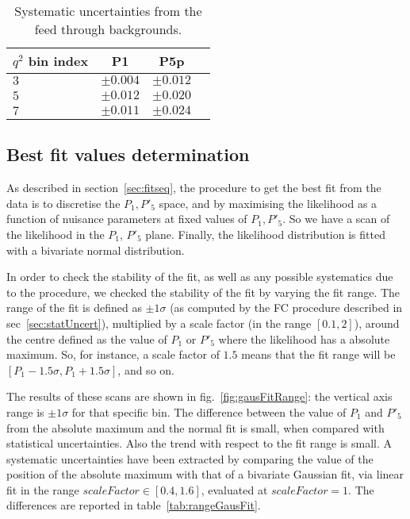 \begin{table*}[!htb]
  \begin {center}
    \begin{small}
      \caption{Systematic uncertainties from the feed through backgrounds.
        \label{tab:feed-through}}
      \begin{tabular}{|l|c|c|c|}
        \hline
        $q^2$ bin index   & P1 & P5p \\
        \hline
        $ 3 $ & $\pm 0.004$  & $\pm 0.012$    \\
        $ 5 $ & $\pm 0.012$  & $\pm 0.020$  \\
        $ 7 $ & $\pm 0.011$  & $\pm 0.024$   \\
        \hline
      \end{tabular}
    \end{small}
  \end{center}
\end{table*}

\subsection{Best fit values determination}\label{sec:bestFit}

As described in section~\ref{sec:fitseq}, the procedure to get the best fit from the data is to discretise the $P_1,P'_5$ space, and by maximising the likelihood as a function of nuisance parameters at fixed values of $P_1,P'_5$.
So we have a scan of the likelihood in the $P_1$, $P'_5$ plane.
Finally, the likelihood distribution is fitted with a bivariate normal distribution.

In order to check the stability of the fit, as well as any possible systematics due to the procedure, we checked the stability of the fit by varying the fit range.
The range of the fit is defined as $\pm1\sigma$ (as computed by the FC procedure described in sec~\ref{sec:statUncert}), multiplied by a scale factor (in the range $[0.1,2]$), around the centre defined as the value of $P_1$ or $P'_5$ where the likelihood has a absolute maximum.
So, for instance, a scale factor of $1.5$ means that the fit range will be $[P_1-1.5\sigma,P_1+1.5\sigma]$, and so on.

The results of these scans are shown in fig.~\ref{fig:gausFitRange}: the vertical axis range is $\pm1\sigma$ for that specific bin.
The difference between the value of $P_1$ and $P'_5$ from the absolute maximum and the normal fit is small, when compared with statistical uncertainties.
Also the trend with respect to the fit range is small.
A systematic uncertainties have been extracted by comparing the value of the position of the absolute maximum with that of a bivariate Gaussian fit, via linear fit in the range $scaleFactor\in[0.4,1.6]$, evaluated at $scaleFactor=1$.
The differences are reported in table~\ref{tab:rangeGausFit}.

